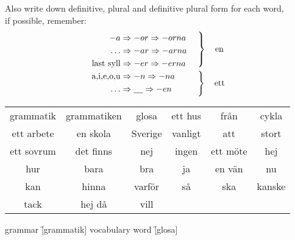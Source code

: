 \begin{flushleft}
    Also write down definitive, plural and definitive plural form
    for each word,\\
    if possible, remember:
    \begin{equation*}
        \begin{aligned}
            -a &\Rightarrow -or \Rightarrow -orna & \\
            \ldots &\Rightarrow -ar \Rightarrow -arna & \\
            \text{last syll} &\Rightarrow -er \Rightarrow -erna & \\
            \text{a,i,e,o,u} &\Rightarrow -n \Rightarrow -na & \\
            \ldots &\Rightarrow \underline{\phantom{no}} \Rightarrow -en & \\
        \end{aligned}
        \begin{aligned}
            &\left.\vphantom{\begin{aligned}
                -a &\Rightarrow -or \Rightarrow -orna & \\
                \ldots &\Rightarrow -ar \Rightarrow -arna & \\
                \text{last syll} &\Rightarrow -er \Rightarrow -erna & \\
            \end{aligned}}\right\rbrace\quad\text{en}\\
            &\left.\vphantom{\begin{aligned}
                \text{a,i,e,o,u} &\Rightarrow -n \Rightarrow -na & \\
                \ldots &\Rightarrow \underline{\phantom{no}} \Rightarrow -en & \\
            \end{aligned}}\right\rbrace\quad\text{ett}
        \end{aligned}
    \end{equation*}
\end{flushleft}
\begin{center}
    \begin{tabular}{|c c c c c c|}
        \hline
        grammatik & grammatiken & glosa & ett hus & från & cykla \\
        ett arbete & en skola & Sverige & vanligt & att & stort \\
        ett sovrum & det finns & nej & ingen & ett möte & hej \\
        hur & bara & bra & ja & en vän & nu \\
        kan & hinna & varför & så & ska & kanske \\
        tack & hej då & vill &&& \\
        \hline
    \end{tabular}
\end{center}

\begin{questions}
    \begin{multicols}{2}
        \raggedcolumns
        \question grammar \f[grammatik]
        \question vocabulary word \f[glosa]
    \end{multicols}
\end{questions}